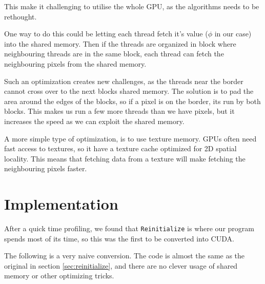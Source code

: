This make it challenging to utilise the whole GPU, as the algorithms
needs to be rethought.

One way to do this could be letting each thread fetch it's value
($\phi$ in our case) into the shared memory. Then if the threads are
organized in block where neighbouring threads are in the same block,
each thread can fetch the neighbouring pixels from the shared memory.

Such an optimization creates new challenges, as the threads near the
border cannot cross over to the next blocks shared memory. The
solution is to pad the area around the edges of the blocks, so if a
pixel is on the border, its run by both blocks. This makes us run a
few more threads than we have pixels, but it increases the speed as we
can exploit the shared memory.

A more simple type of optimization, is to use texture memory. GPUs
often need fast access to textures, so it have a texture cache
optimized for 2D spatial locality. This means that fetching data from
a texture will make fetching the neighbouring pixels faster.

\section{Implementation}

After a quick time profiling, we found that \texttt{Reinitialize} is
where our program spends most of its time, so this was the first to be
converted into CUDA.

The following is a very naive conversion. The code is almost the same
as the original in section \ref{sec:reinitialize}, and there are no
clever usage of shared memory or other optimizing tricks.

